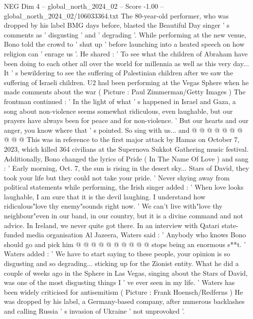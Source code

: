 \begin{textsample}{NEG Dim 4 – global\_north\_2024\_02 – Score -1.00 – global\_north\_2024\_02/106033364.txt}  \label{ex:f4_neg_271}
The 80-year-old performer, who was dropped by his label BMG days before, blasted the Beautiful Day singer ' s comments as ' disgusting ' and ' degrading '.
While performing at the new venue, Bono told the crowd to ' shut up ' before launching into a heated speech on how religion can ' enrage us '.
He shared : ' To see what the children of Abraham have been doing to each other all over the world for millennia as well as this very day...
It ' s bewildering to see the suffering of Palestinian children after we saw the suffering of Israeli children.
U2 had been performing at the Vegas Sphere when he made comments about the war ( Picture : Paul Zimmerman/Getty Images ) The frontman continued : ' In the light of what ' s happened in Israel and Gaza, a song about non-violence seems somewhat ridiculous, even laughable, but our prayers have always been for peace and for non-violence. ' But our hearts and our anger, you know where that ' s pointed.
So sing with us... and @ @ @ @ @ @ @ @ @ @ This was in reference to the first major attack by Hamas on October 7, 2023, which killed 364 civilians at the Supernova Sukkot Gathering music festival.
Additionally, Bono changed the lyrics of Pride ( In The Name Of Love ) and sang : ' Early morning, Oct. 7, the sun is rising in the desert sky...
Stars of David, they took your life but they could not take your pride. ' Never shying away from political statements while performing, the Irish singer added : ' When love looks laughable, I am sure that it is the devil laughing.
I understand how ridiculous"love thy enemy"sounds right now. ' We can't live with"love thy neighbour"even in our band, in our country, but it is a divine command and not advice.
In Ireland, we never quite got there.
In an interview with Qatari state-funded media organisation Al Jazeera, Waters said : ' Anybody who knows Bono should go and pick him @ @ @ @ @ @ @ @ @ @ stops being an enormous s**t. ' Waters added : ' We have to start saying to these people, your opinion is so disgusting and so degrading... sticking up for the Zionist entity.
What he did a couple of weeks ago in the Sphere in Las Vegas, singing about the Stars of David, was one of the most disgusting things I ' ve ever seen in my life. ' Waters has been widely criticised for antisemitism ( Picture : Frank Hoensch/Redferns ) He was dropped by his label, a Germany-based company, after numerous backlashes and calling Russia ' s invasion of Ukraine ' not unprovoked '.

\end{textsample}
